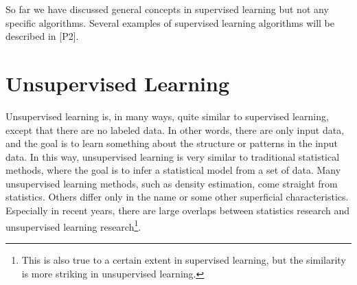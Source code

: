 So far we have discussed general concepts in supervised learning but not any specific algorithms. Several examples of supervised learning algorithms will be described in [P2].
%
\section{Unsupervised Learning}
\label{sec:unsupervised-learning}
Unsupervised learning is, in many ways, quite similar to supervised learning, except that there are no labeled data. In other words, there are only input data, and the goal is to learn something about the structure or patterns in the input data. In this way, unsupervised learning is very similar to traditional statistical methods, where the goal is to infer a statistical model from a set of data. Many unsupervised learning methods, such as density estimation, come straight from statistics. Others differ only in the name or some other superficial characteristics. Especially in recent years, there are large overlaps between statistics research and unsupervised learning research\footnote{This is also true to a certain extent in supervised learning, but the similarity is more striking in unsupervised learning.}.

